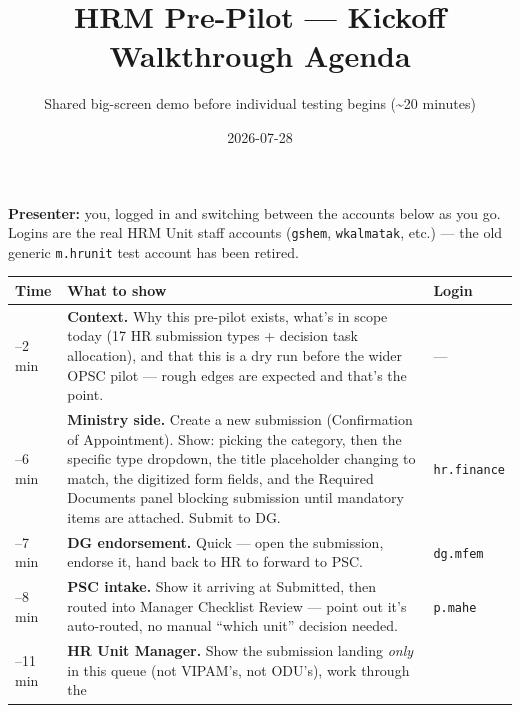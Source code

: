 \documentclass[
  10pt,
  letterpaper,
  DIV=11,
  numbers=noendperiod]{scrartcl}
\title{HRM Pre-Pilot --- Kickoff Walkthrough Agenda}
\subtitle{Shared big-screen demo before individual testing begins
(\textasciitilde20 minutes)}
\author{}
\date{2026-07-28}
\newcounter{none} %
\begin{document}
\maketitle


\textbf{Presenter:} you, logged in and switching between the accounts
below as you go. Logins are the real HRM Unit staff accounts
(\texttt{gshem}, \texttt{wkalmatak}, etc.) --- the old generic
\texttt{m.hrunit} test account has been retired.

{\def\LTcaptype{none} %
\begin{longtable}[]{@{}
  >{\centering\arraybackslash}p{}
  >{\raggedright\arraybackslash}p{}
  >{\raggedright\arraybackslash}p{}@{}}
\toprule\noalign{}
\begin{minipage}[b]{\linewidth}\centering
Time
\end{minipage} & \begin{minipage}[b]{\linewidth}\raggedright
What to show
\end{minipage} & \begin{minipage}[b]{\linewidth}\raggedright
Login
\end{minipage} \\
\midrule\noalign{}
\endhead
\bottomrule\noalign{}
\endlastfoot
0--2 min & \textbf{Context.} Why this pre-pilot exists, what's in scope
today (17 HR submission types + decision task allocation), and that this
is a dry run before the wider OPSC pilot --- rough edges are expected
and that's the point. & --- \\
2--6 min & \textbf{Ministry side.} Create a new submission (Confirmation
of Appointment). Show: picking the category, then the specific type
dropdown, the title placeholder changing to match, the digitized form
fields, and the Required Documents panel blocking submission until
mandatory items are attached. Submit to DG. & \texttt{hr.finance} \\
6--7 min & \textbf{DG endorsement.} Quick --- open the submission,
endorse it, hand back to HR to forward to PSC. & \texttt{dg.mfem} \\
7--8 min & \textbf{PSC intake.} Show it arriving at Submitted, then
routed into Manager Checklist Review --- point out it's auto-routed, no
manual ``which unit'' decision needed. & \texttt{p.mahe} \\
8--11 min & \textbf{HR Unit Manager.} Show the submission landing
\emph{only} in this queue (not VIPAM's, not ODU's), work through the

\end{longtable}}
\end{document}
